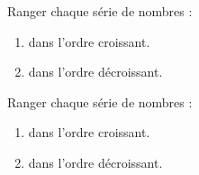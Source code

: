 \begin{exercice}
   Ranger chaque série de nombres :
   \begin{enumerate}
      \item dans l'ordre croissant. \\ [1mm]
             \;  \;  \;  \;  \;  \smallskip
      \item dans l'ordre décroissant. \\ [1mm]
             \;  \;  \;  \;  \;  \; 
   \end{enumerate}
\end{exercice}
\begin{corrige}
   Ranger chaque série de nombres :

   \begin{enumerate}
      \item dans l'ordre croissant. \\ [1mm]
             \;  \;  \;  \;  \;  \smallskip

            {\red {} \;  \;  \;  \;  \;  \smallskip}
      \item dans l'ordre décroissant. \\ [1mm]
             \;  \;  \;  \;  \;  \;  \smallskip

            {\red {} \;  \;  \;  \;  \;  \; }
   \end{enumerate}
\end{corrige}